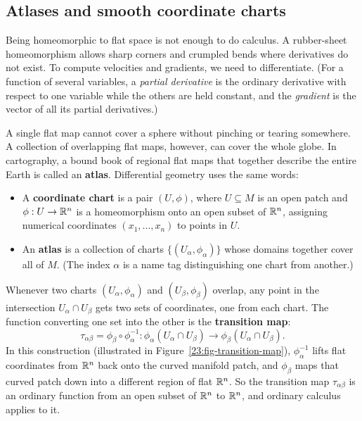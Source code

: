 \subsection{Atlases and smooth coordinate charts}

Being homeomorphic to flat space is not enough to do calculus. A rubber-sheet homeomorphism allows sharp corners and crumpled bends where derivatives do not exist. To compute velocities and gradients, we need to differentiate. (For a function of several variables, a \emph{partial derivative} is the ordinary derivative with respect to one variable while the others are held constant, and the \emph{gradient} is the vector of all its partial derivatives.)

A single flat map cannot cover a sphere without pinching or tearing somewhere. A collection of overlapping flat maps, however, can cover the whole globe. In cartography, a bound book of regional flat maps that together describe the entire Earth is called an \textbf{atlas}. Differential geometry uses the same words:
\begin{itemize}
\item A \textbf{coordinate chart} is a pair $(U, \phi)$, where $U \subseteq M$ is an open patch and $\phi: U \to \mathbb{R}^n$ is a homeomorphism onto an open subset of $\mathbb{R}^n$, assigning numerical coordinates $(x_1, \dots, x_n)$ to points in $U$.
\item An \textbf{atlas} is a collection of charts $\{(U_\alpha, \phi_\alpha)\}$ whose domains together cover all of $M$. (The index $\alpha$ is a name tag distinguishing one chart from another.)
\end{itemize}

Whenever two charts $(U_\alpha, \phi_\alpha)$ and $(U_\beta, \phi_\beta)$ overlap, any point in the intersection $U_\alpha \cap U_\beta$ gets two sets of coordinates, one from each chart. The function converting one set into the other is the \textbf{transition map}:
\[
\tau_{\alpha \beta} = \phi_\beta \circ \phi_\alpha^{-1} : \phi_\alpha(U_\alpha \cap U_\beta) \to \phi_\beta(U_\alpha \cap U_\beta).
\]
In this construction (illustrated in Figure~\ref{23:fig-transition-map}), $\phi_\alpha^{-1}$ lifts flat coordinates from $\mathbb{R}^n$ back onto the curved manifold patch, and $\phi_\beta$ maps that curved patch down into a different region of flat $\mathbb{R}^n$. So the transition map $\tau_{\alpha \beta}$ is an ordinary function from an open subset of $\mathbb{R}^n$ to $\mathbb{R}^n$, and ordinary calculus applies to it.

